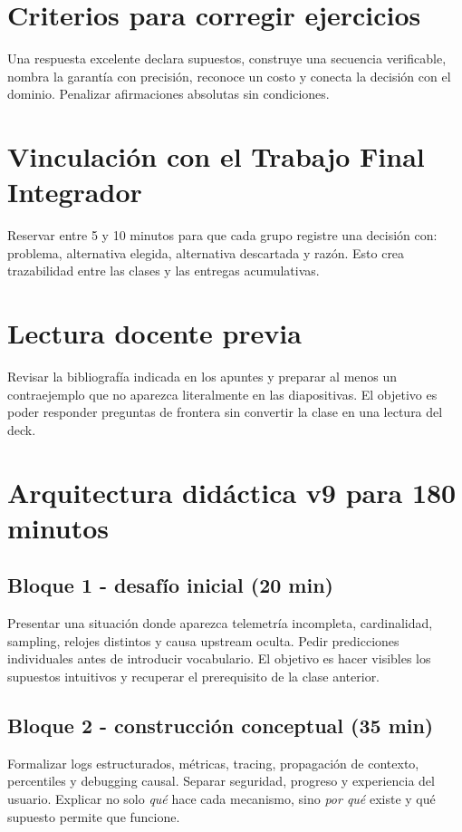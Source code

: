 \documentclass[variant=docente,cover=institutional,mode=screen]{ua-engineering-v6-article}
\begin{document}
\section{Criterios para corregir ejercicios}
Una respuesta excelente declara supuestos, construye una secuencia verificable, nombra la garantía con precisión, reconoce un costo y conecta la decisión con el dominio. Penalizar afirmaciones absolutas sin condiciones.
\section{Vinculación con el Trabajo Final Integrador}
Reservar entre 5 y 10 minutos para que cada grupo registre una decisión con: problema, alternativa elegida, alternativa descartada y razón. Esto crea trazabilidad entre las clases y las entregas acumulativas.
\section{Lectura docente previa}
Revisar la bibliografía indicada en los apuntes y preparar al menos un contraejemplo que no aparezca literalmente en las diapositivas. El objetivo es poder responder preguntas de frontera sin convertir la clase en una lectura del deck.

\section{Arquitectura didáctica v9 para 180 minutos}
\subsection*{Bloque 1 - desafío inicial (20 min)}
Presentar una situación donde aparezca telemetría incompleta, cardinalidad, sampling, relojes distintos y causa upstream oculta. Pedir predicciones individuales antes de introducir vocabulario. El objetivo es hacer visibles los supuestos intuitivos y recuperar el prerequisito de la clase anterior.

\subsection*{Bloque 2 - construcción conceptual (35 min)}
Formalizar logs estructurados, métricas, tracing, propagación de contexto, percentiles y debugging causal. Separar seguridad, progreso y experiencia del usuario. Explicar no solo \emph{qué} hace cada mecanismo, sino \emph{por qué} existe y qué supuesto permite que funcione.
\end{document}
